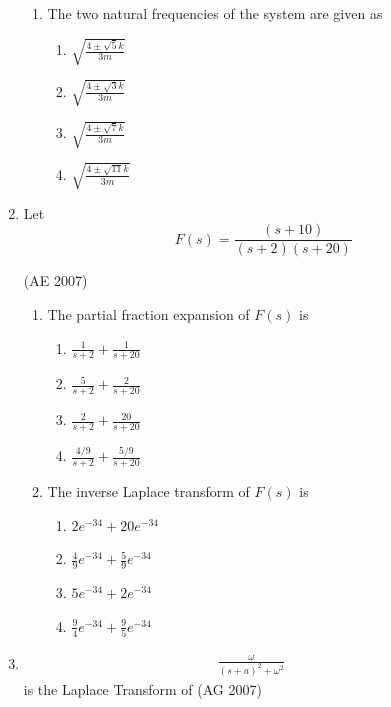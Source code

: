 \begin{enumerate}[label=\thesubsection.\arabic*,ref=\thesubsection.\theenumi]
\begin{enumerate}
    \item The two natural frequencies of the system are given as
    \begin{multicols}{4}
    \begin{enumerate}
        \item $\sqrt{\frac{4 \pm \sqrt{5} k}{3 m}}$
        \item $\sqrt{\frac{4 \pm \sqrt{3} k}{3 m}}$
        \item $\sqrt{\frac{4 \pm \sqrt{7} k}{3 m}}$
        \item $\sqrt{\frac{4 \pm \sqrt{11} k}{3 m}}$
    \end{enumerate}
    \end{multicols}
    
\end{enumerate}

\item Let $$F(s) = \frac{(s + 10)}{(s +2)(s + 20)}$$

\hfill (AE 2007)
\begin{enumerate}
    \item The partial fraction expansion of $F(s)$ is
    \begin{multicols}{4}
    \begin{enumerate}
        \item $\frac{1}{s + 2} + \frac{1}{s + 20}$
        \item $\frac{5}{s + 2} + \frac{2}{s + 20}$
        \item $\frac{2}{s + 2} + \frac{20}{s + 20}$
        \item $\frac{4/9}{s + 2} + \frac{5/9}{s + 20}$
    \end{enumerate}
    \end{multicols}
    \item The inverse Laplace transform of $F(s)$ is
    \begin{multicols}{2}
    \begin{enumerate}
        \item $2e^{-34} + 20e^{-34}$
        \item $\frac{4}{9}e^{-34} + \frac{5}{9}e^{-34}$
        \item $5e^{-34} + 2e^{-34}$
        \item $\frac{9}{4}e^{-34} + \frac{9}{5}e^{-34}$
    \end{enumerate}
    \end{multicols}
    
\end{enumerate}
\item 
\begin{align*}
\frac{\omega}{(s + a)^2 + \omega^2} &\quad 
\end{align*}
is the Laplace Transform of
\hfill(AG 2007)
\begin{multicols}{2}
\begin{enumerate}
  

\end{enumerate}
\end{multicols}
\end{enumerate}
